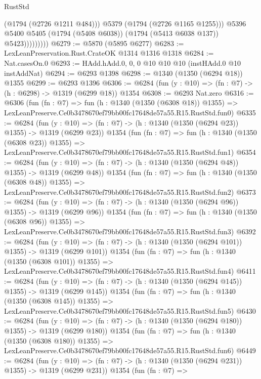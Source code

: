 \begin{lexlean}{RustStd}
\begin{coremodule}
                          (@1794 (@2726 @1211 @484)))
                        @5379
                        (@1794 (@2726 @1165 @1255)))
                      @5396
                      @5400
                      @5405
                      (@1794 (@5408 @6038))
                      (@1794 (@5413 @6038 @137))
                      @5423)))))))))
@6279 := @5870 (@5895 @6277)
@6283 := LexLeanPreservation.Rust.CrateOK @1314 @1316 @1318
@6284 := Nat.casesOn.{0}
@6293 := HAdd.hAdd.{0, 0, 0} @10 @10 @10 (instHAdd.{0} @10 instAddNat)
@6294 := @6293 @1398
@6298 := @1340 (@1350 (@6294 @18)) @1355
@6299 := @6293 @1396
@6306 := @6284 (fun (y : @10) => (fn : @7) -> (h : @6298) -> @1319 (@6299 @18)) @1354
@6308 := @6293 Nat.zero
@6316 := @6306
    (fun (fn : @7) =>
    fun (h : @1340 (@1350 (@6308 @18)) @1355) =>
    LexLeanPreserve.Ce0b3478670ef79bb00fc17648de57a55.R15.RustStd.fun0)
@6335 := @6284
    (fun (y : @10) => (fn : @7) -> (h : @1340 (@1350 (@6294 @23)) @1355) -> @1319 (@6299 @23))
    @1354
    (fun (fn : @7) =>
    fun (h : @1340 (@1350 (@6308 @23)) @1355) =>
    LexLeanPreserve.Ce0b3478670ef79bb00fc17648de57a55.R15.RustStd.fun1)
@6354 := @6284
    (fun (y : @10) => (fn : @7) -> (h : @1340 (@1350 (@6294 @48)) @1355) -> @1319 (@6299 @48))
    @1354
    (fun (fn : @7) =>
    fun (h : @1340 (@1350 (@6308 @48)) @1355) =>
    LexLeanPreserve.Ce0b3478670ef79bb00fc17648de57a55.R15.RustStd.fun2)
@6373 := @6284
    (fun (y : @10) => (fn : @7) -> (h : @1340 (@1350 (@6294 @96)) @1355) -> @1319 (@6299 @96))
    @1354
    (fun (fn : @7) =>
    fun (h : @1340 (@1350 (@6308 @96)) @1355) =>
    LexLeanPreserve.Ce0b3478670ef79bb00fc17648de57a55.R15.RustStd.fun3)
@6392 := @6284
    (fun (y : @10) => (fn : @7) -> (h : @1340 (@1350 (@6294 @101)) @1355) -> @1319 (@6299 @101))
    @1354
    (fun (fn : @7) =>
    fun (h : @1340 (@1350 (@6308 @101)) @1355) =>
    LexLeanPreserve.Ce0b3478670ef79bb00fc17648de57a55.R15.RustStd.fun4)
@6411 := @6284
    (fun (y : @10) => (fn : @7) -> (h : @1340 (@1350 (@6294 @145)) @1355) -> @1319 (@6299 @145))
    @1354
    (fun (fn : @7) =>
    fun (h : @1340 (@1350 (@6308 @145)) @1355) =>
    LexLeanPreserve.Ce0b3478670ef79bb00fc17648de57a55.R15.RustStd.fun5)
@6430 := @6284
    (fun (y : @10) => (fn : @7) -> (h : @1340 (@1350 (@6294 @180)) @1355) -> @1319 (@6299 @180))
    @1354
    (fun (fn : @7) =>
    fun (h : @1340 (@1350 (@6308 @180)) @1355) =>
    LexLeanPreserve.Ce0b3478670ef79bb00fc17648de57a55.R15.RustStd.fun6)
@6449 := @6284
    (fun (y : @10) => (fn : @7) -> (h : @1340 (@1350 (@6294 @231)) @1355) -> @1319 (@6299 @231))
    @1354
    (fun (fn : @7) =>

\end{coremodule}
\end{lexlean}
